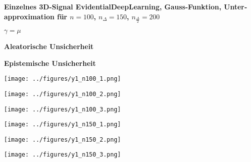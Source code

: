 \begin{otherlanguage}{ngerman}
\begin{samepage}
\begin{minipage}{\textwidth}

\noindent\textbf{Einzelnes 3D-Signal \gls{EvidentialDeepLearning}, Gauss-Funktion,
Unterapproximation für $n=100$, $n_{\Delta}=150$, $n_{\frac{\Delta}{2}}=200$}


\begin{minipage}{0.05\textwidth}\vspace{0.5cm}\end{minipage}%
\begin{minipage}{0.3\textwidth}\centering \textbf{$\gamma=\mu$}\end{minipage}%
\begin{minipage}{0.3\textwidth}\centering \textbf{Aleatorische Unsicherheit}\end{minipage}%
\begin{minipage}{0.3\textwidth}\centering \textbf{Epistemische Unsicherheit}\end{minipage}

\vspace{0.125cm}

\begin{minipage}{0.05\textwidth}\centering{}\end{minipage}%
\begin{minipage}{0.3\textwidth}\centering\texttt{[image: ../figures/y1\_n100\_1.png]}\end{minipage}%
\begin{minipage}{0.3\textwidth}\centering\texttt{[image: ../figures/y1\_n100\_2.png]}\end{minipage}%
\begin{minipage}{0.3\textwidth}\centering\texttt{[image: ../figures/y1\_n100\_3.png]}\end{minipage}

\vspace{0.125cm}

\begin{minipage}{0.05\textwidth}\centering{}\end{minipage}%
\begin{minipage}{0.3\textwidth}\centering\texttt{[image: ../figures/y1\_n150\_1.png]}\end{minipage}%
\begin{minipage}{0.3\textwidth}\centering\texttt{[image: ../figures/y1\_n150\_2.png]}\end{minipage}%
\begin{minipage}{0.3\textwidth}\centering\texttt{[image: ../figures/y1\_n150\_3.png]}\end{minipage}


\end{minipage}
\end{samepage}
\end{otherlanguage}
